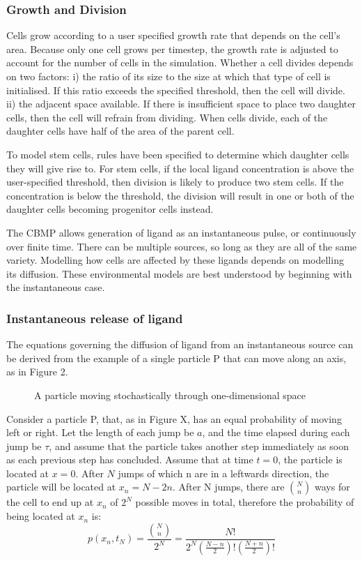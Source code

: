 \documentclass[11.5pt]{article}
\begin{document}
\subsubsection{Growth and Division}

Cells grow according to a user specified growth rate that depends on the 
cell's area. Because only one cell grows per timestep, the growth rate 
is adjusted to account for the number of cells in the simulation. 
Whether a cell divides depends on two factors: i) the ratio of its size 
to the size at which that type of cell is initialised. If this ratio 
exceeds the specified threshold, then the cell will divide. ii) the 
adjacent space available. If there is insufficient space to place two 
daughter cells, then the cell will refrain from dividing. When cells 
divide, each of the daughter cells have half of the area of the parent 
cell. 

To model stem cells, rules have been specified to determine which 
daughter cells they will give rise to. For stem cells, if the local 
ligand concentration is above the user-specified threshold, then 
division is likely to produce two stem cells. If the concentration is 
below the threshold, the division will result in one or both of the 
daughter cells becoming progenitor cells instead.

The CBMP allows generation of ligand as an instantaneous pulse, or 
continuously over finite time. There can be multiple sources, so long as 
they are all of the same variety. Modelling how cells are affected by 
these ligands depends on modelling its diffusion. These environmental 
models are best understood by beginning with the instantaneous case.

\subsubsection{Instantaneous release of ligand}
The equations governing the diffusion of ligand from an instantaneous 
source can be derived from the example of a single particle P that can 
move along an axis, as in Figure 2.

\begin{figure}[H]
\centering
\caption{A particle moving stochastically through 
one-dimensional space}
\end{figure}

Consider a particle P, that, as in Figure X, has an equal probability of 
moving left or right. Let the length of each jump be \(a\), and 
the time elapsed during each jump be \(\tau\), and assume that 
the particle takes another step immediately as soon as each previous 
step has concluded. Assume that at time 
\(t=0\), the particle is located at \(x=0\). After \(N\) jumps of which n are in a 
leftwards direction, the particle will be located at \(x_n = N-2n\). 
After N jumps, there are \(\binom{N}{n}\) ways 
for the cell to end up at \(x_n\) of \(2^N\) possible moves in 
total, therefore the probability of being located at \(x_n\) is:
\begin{equation} p(x_n,t_N) = \frac{\binom{N}{n}}{2^N} = \frac{N!}{2^N(\frac{N-n}{2})!(\frac{N+n}{2})!}
\end{equation}
\end{document}
